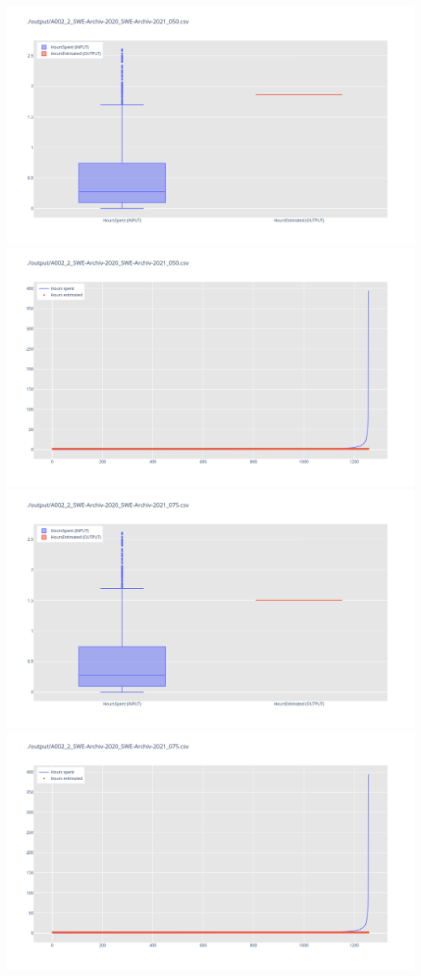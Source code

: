 \includegraphics[width=\textwidth]{Scripts/output/A002_2_SWE-Archiv-2020_SWE-Archiv-2021_050.csv.png}
\includegraphics[width=\textwidth]{Scripts/output/A002_2_SWE-Archiv-2020_SWE-Archiv-2021_050.csv.scatter.png}
\includegraphics[width=\textwidth]{Scripts/output/A002_2_SWE-Archiv-2020_SWE-Archiv-2021_075.csv.png}
\includegraphics[width=\textwidth]{Scripts/output/A002_2_SWE-Archiv-2020_SWE-Archiv-2021_075.csv.scatter.png}
